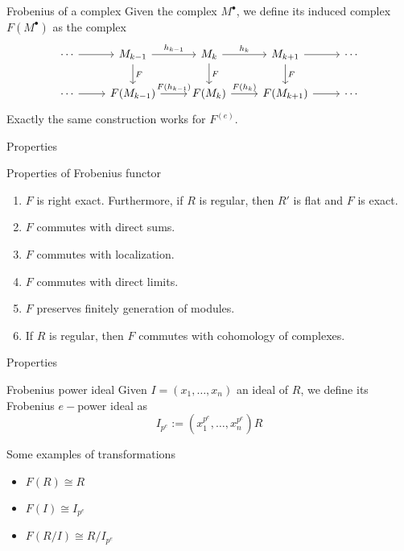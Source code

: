 \documentclass{beamer}
\begin{document}
\begin{frame}[fragile]{}
\begin{block}{Frobenius of a complex}
  Given the complex $M^{\bullet}$, we define its induced complex $F(M^{\bullet})$ as the complex
\[\begin{tikzcd}
	\cdots & {M_{k-1}} & {M_{k}} & {M_{k+1}} & \cdots \\
	\cdots & {F(M_{k-1})} & {F(M_{k})} & {F(M_{k+1})} & \cdots
	\arrow["F", from=1-2, to=2-2]
	\arrow["F", from=1-3, to=2-3]
	\arrow["F", from=1-4, to=2-4]
	\arrow["{h_{k-1}}", from=1-2, to=1-3]
	\arrow["{h_k}", from=1-3, to=1-4]
	\arrow["{F(h_{k-1})}", from=2-2, to=2-3]
	\arrow["{F(h_k)}", from=2-3, to=2-4]
	\arrow[from=1-1, to=1-2]
	\arrow[from=1-4, to=1-5]
	\arrow[from=2-4, to=2-5]
	\arrow[from=2-1, to=2-2]
\end{tikzcd}\]
Exactly the same construction works for $F ^{(e)}$.
\end{block}
\end{frame}



\begin{frame}[fragile]{Properties}
\begin{block}{Properties of Frobenius functor}
\begin{enumerate}
  \item $F$ is right exact. Furthermore, if $R$ is regular, then $R'$ is flat and  $F$ is exact.
  \item $F$ commutes with direct sums.
  \item $F$ commutes with localization.
  \item $F$ commutes with direct limits. 
  \item $F$ preserves finitely generation of modules.
  \item If $R$ is regular, then $F$ commutes with cohomology of complexes.
\end{enumerate}
\end{block}
\end{frame}



\begin{frame}[fragile]{Properties}
\begin{block}{Frobenius power ideal}
 Given  $I = (x_1, \ldots, x_n)$ an ideal of $R$, we define its Frobenius $e-$power ideal as
   \[
	 I _{p^e} := (x_1^{p^e}, \ldots, x_n ^{p^e})R
  \] 
\end{block}
\begin{block}{Some examples of transformations}
  \begin{itemize}
	\item $F(R)\cong R$
	\item $F(I) \cong I_{p^e}$
	\item $F(R / I)\cong R / I_{p^e}$
  \end{itemize}
\end{block}
\end{frame}
\end{document}
